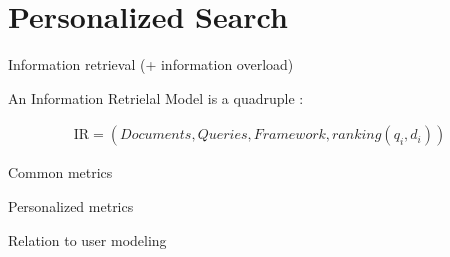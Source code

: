 \section{Personalized Search}

Information retrieval (+ information overload)

An Information Retrielal Model is a quadruple \citep[p23]{Baeza-Yates1999}:

\begin{eqnarray}
  \mathrm{IR} = (Documents, Queries, Framework, ranking(q_i, d_i))
\end{eqnarray}

Common metrics

Personalized metrics

Relation to user modeling


